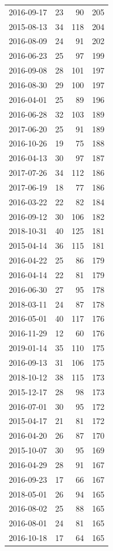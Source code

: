 \begin{tabular}{lrrr}
2016-09-17 & 23 & 90 & 205 \\
2015-08-13 & 34 & 118 & 204 \\
2016-08-09 & 24 & 91 & 202 \\
2016-06-23 & 25 & 97 & 199 \\
2016-09-08 & 28 & 101 & 197 \\
2016-08-30 & 29 & 100 & 197 \\
2016-04-01 & 25 & 89 & 196 \\
2016-06-28 & 32 & 103 & 189 \\
2017-06-20 & 25 & 91 & 189 \\
2016-10-26 & 19 & 75 & 188 \\
2016-04-13 & 30 & 97 & 187 \\
2017-07-26 & 34 & 112 & 186 \\
2017-06-19 & 18 & 77 & 186 \\
2016-03-22 & 22 & 82 & 184 \\
2016-09-12 & 30 & 106 & 182 \\
2018-10-31 & 40 & 125 & 181 \\
2015-04-14 & 36 & 115 & 181 \\
2016-04-22 & 25 & 86 & 179 \\
2016-04-14 & 22 & 81 & 179 \\
2016-06-30 & 27 & 95 & 178 \\
2018-03-11 & 24 & 87 & 178 \\
2016-05-01 & 40 & 117 & 176 \\
2016-11-29 & 12 & 60 & 176 \\
2019-01-14 & 35 & 110 & 175 \\
2016-09-13 & 31 & 106 & 175 \\
2018-10-12 & 38 & 115 & 173 \\
2015-12-17 & 28 & 98 & 173 \\
2016-07-01 & 30 & 95 & 172 \\
2015-04-17 & 21 & 81 & 172 \\
2016-04-20 & 26 & 87 & 170 \\
2015-10-07 & 30 & 95 & 169 \\
2016-04-29 & 28 & 91 & 167 \\
2016-09-23 & 17 & 66 & 167 \\
2018-05-01 & 26 & 94 & 165 \\
2016-08-02 & 25 & 88 & 165 \\
2016-08-01 & 24 & 81 & 165 \\
2016-10-18 & 17 & 64 & 165 \\

\end{tabular}
